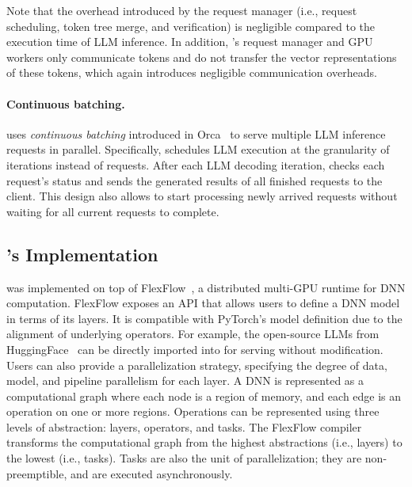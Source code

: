 Note that the overhead introduced by the request manager (i.e., request scheduling, token tree merge, and verification) is negligible compared to the execution time of LLM inference. In addition, \SpecInfer's request manager and GPU workers only communicate tokens and do not transfer the vector representations of these tokens, which again introduces negligible communication overheads.

\paragraph{Continuous batching.}
\SpecInfer uses {\em continuous batching} introduced in Orca~\cite{yu2022orca} to serve multiple LLM inference requests in parallel. Specifically, \SpecInfer schedules LLM execution at the granularity of iterations instead of requests. After each LLM decoding iteration, \SpecInfer checks each request's status and sends the generated results of all finished requests to the client. This design also allows \SpecInfer to start processing newly arrived requests without waiting for all current requests to complete.

\subsection{\SpecInfer's Implementation}
\label{specinfer:subsec:implementation}
\SpecInfer was implemented on top of FlexFlow~\cite{jia2019flexflow,unger2022unity}, a distributed multi-GPU runtime for DNN computation. FlexFlow exposes an API that allows users to define a DNN model in terms of its layers.
It is compatible with PyTorch's model definition due to the alignment of underlying operators. For example, the open-source LLMs from HuggingFace~\cite{huggingface} can be directly imported into \SpecInfer for serving without modification.
Users can also provide a parallelization strategy, specifying the degree of data, model, and pipeline parallelism for each layer.
A DNN is represented as a computational graph where each node is a region of memory, and each edge is an operation on one or more regions. Operations can be represented using three levels of abstraction: layers, operators, and tasks. The FlexFlow compiler transforms the computational graph from the highest abstractions (i.e., layers) to the lowest (i.e., tasks). Tasks are also the unit of parallelization; they are non-preemptible, and are executed asynchronously.

